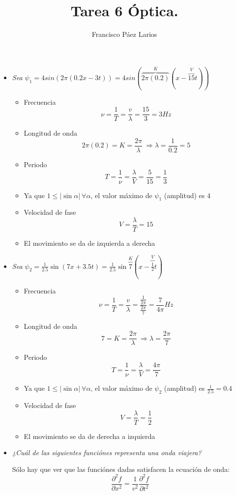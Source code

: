 \documentclass{article}
\title{Tarea 6 Óptica.}
\author{Francisco Páez Larios}
\begin{document}
\maketitle


\begin{itemize}

\item \textit{Sea $ \psi_{1}=4 sin(2 \pi (0.2x-3t))=4sin( \overbrace{2\pi (0.2)}^{K} (x- \overbrace{15}^{V}t))  $}
\begin{itemize}
\item Frecuencia $$ \nu=\frac{1}{T} =\frac{v}{\lambda}=\frac{15}{3}=3 Hz $$
\item Longitud de onda $$ 2\pi(0.2)=K=\frac{2\pi}{\lambda} \: \Rightarrow \lambda=\frac{1}{0.2}=5 $$
\item Periodo $$ T=\frac{1}{\nu}=\frac{\lambda}{V}=\frac{5}{15}=\frac{1}{3} $$
\item Ya que $  1 \leq | \sin \alpha| \: \forall \alpha $, el valor máximo de $ \psi_{1}$ (amplitud)  es 4
\item Velocidad  de fase $$ V=\frac{\lambda}{T}=15$$
\item El movimiento se da de izquierda a derecha
\end{itemize}

\item \textit{Sea $ \psi_{2}= \displaystyle \frac{1}{2.5} \sin(7x+3.5t)=\frac{1}{2.5} \sin \overbrace{7}^K (x-\overbrace{\frac{1}{2}}^{V} t)$}
\begin{itemize}
\item Frecuencia $$ \nu=\frac{1}{T} =\frac{v}{\lambda}=\frac{\frac{1}{2\pi}}{\frac{2\pi}{7}}=\frac{7}{4\pi} Hz $$
\item Longitud de onda $$ 7=K=\frac{2\pi}{\lambda} \: \Rightarrow \lambda=\frac{2\pi}{7} $$
\item Periodo $$ T=\frac{1}{\nu}=\frac{\lambda}{V}=\frac{4\pi}{7} $$
\item Ya que $  1 \leq | \sin \alpha| \: \forall \alpha $, el valor máximo de $ \psi_{2}$ (amplitud)  es $\frac{1}{2.5}=0.4$
\item Velocidad  de fase $$ V=\frac{\lambda}{T}=\frac{1}{2}$$
\item El movimiento se da de derecha a izquierda
\end{itemize}

\item \textit{¿Cuál de las siguientes funciónes representa una onda viajera?}

Sólo hay que ver que las funciónes dadas satisfacen la ecuación de onda:
 \begin{equation}
\frac{\partial^{2}f}{\partial x^{2}}= \frac{1}{v^{2}} \frac{\partial^{2}f}{\partial t^{2}}
\end{equation}  


\end{itemize}
\end{document}
